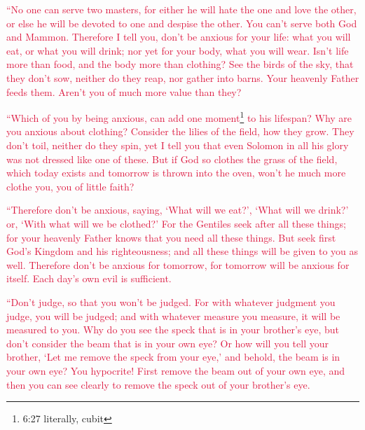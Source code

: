 \myverse{}\textcolor{crimson}{“No one can serve two masters, for either he will hate the
	one and love the other, or else he will be devoted to one and despise the other. You can’t serve both
	God and Mammon.
}
\myverse{}\textcolor{crimson}{Therefore I tell you, don’t be anxious for your life: what you will eat,
	or what you will drink; nor yet for your body, what you will wear. Isn’t life more than food, and the
	body more than clothing?
}
\myverse{}\textcolor{crimson}{See the birds of the sky, that they don’t sow, neither do they reap, nor
	gather into barns. Your heavenly Father feeds them. Aren’t you of much more value than they?}

\myverse{}\textcolor{crimson}{“Which of you by being anxious, can add one moment}\footnote{6:27 literally, cubit}
\textcolor{crimson}{to his lifespan?
}
\myverse{}\textcolor{crimson}{Why are you anxious about clothing? Consider the lilies of the field,
	how they grow. They don’t toil, neither do they spin,
}
\myverse{}\textcolor{crimson}{yet I tell you that even Solomon in all his glory was not dressed like
	one of these.
}
\myverse{}\textcolor{crimson}{But if God so clothes the grass of the field, which today exists and tomorrow
	is thrown into the oven, won’t he much more clothe you, you of little faith?}

\myverse{}\textcolor{crimson}{“Therefore don’t be anxious, saying, ‘What will we eat?’,
	‘What will we drink?’ or, ‘With what will we be clothed?’
}
\myverse{}\textcolor{crimson}{For the Gentiles seek after all these things; for your heavenly Father
	knows that you need all these things.
}
\myverse{}\textcolor{crimson}{But seek first God’s Kingdom and his righteousness; and all these things
	will be given to you as well.
}
\myverse{}\textcolor{crimson}{Therefore don’t be anxious for tomorrow, for tomorrow will be anxious
	for itself. Each day’s own evil is sufficient.}


\mychapter{} \myverse*{}\textcolor{crimson}{“Don’t judge, so that you won’t be judged.
}
\myverse{}\textcolor{crimson}{For with whatever judgment you judge, you will be judged; and with whatever
	measure you measure, it will be measured to you.
}
\myverse{}\textcolor{crimson}{Why do you see the speck that is in your brother’s eye, but don’t consider
	the beam that is in your own eye?
}
\myverse{}\textcolor{crimson}{Or how will you tell your brother, ‘Let me remove the speck from your eye,’
	and behold, the beam is in your own eye?
}
\myverse{}\textcolor{crimson}{You hypocrite! First remove the beam out of your own eye, and then you can
	see clearly to remove the speck out of your brother’s eye.}

